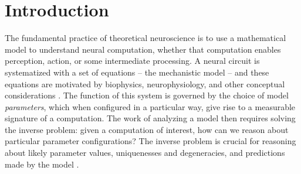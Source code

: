 \documentclass[11pt]{article}
\begin{document}


\section{Introduction}
The fundamental practice of theoretical neuroscience is to use a mathematical model to understand neural computation, whether that computation enables perception, action, or some intermediate processing.  
A neural circuit is systematized with a set of equations -- the mechanistic model -- and these equations are motivated by biophysics, neurophysiology, and other conceptual considerations \cite{kopell1988coupled,  marder1998biophysics, abbott2008theoretical, wang2010neurophysiological}.
The function of this system is governed by the choice of model \emph{parameters}, which when configured in a particular way, give rise to a measurable signature of a computation.   
The work of analyzing a model then requires solving the inverse problem: given a computation of interest, how can we reason about particular parameter configurations?  
The inverse problem is crucial for reasoning about likely parameter values, uniquenesses and degeneracies, and predictions made by the model \cite{gutenkunst2007universally, o2014cell}.
\end{document}
